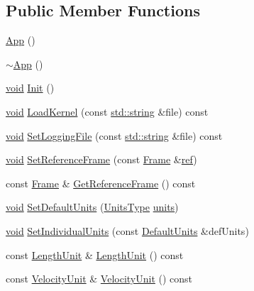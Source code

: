 \subsection*{Public Member Functions}
\begin{DoxyCompactItemize}
\item 
\hyperlink{class_app_acb8cbf3e285b91d0170ffe87df5989c5}{App} ()
\item 
\hyperlink{class_app_a34f1f253b1cef5f4ecbac66eaf6964ec}{$\sim$\+App} ()
\item 
\hyperlink{wglext_8h_a9e6b7f1933461ef318bb000d6bd13b83}{void} \hyperlink{class_app_a12b15f30e7c0a6f5a2ebf5b1b6dcb409}{Init} ()
\item 
\hyperlink{wglext_8h_a9e6b7f1933461ef318bb000d6bd13b83}{void} \hyperlink{class_app_a4c9cf8bd78997b07082a3a5d23e9f056}{Load\+Kernel} (const \hyperlink{glext_8h_ae84541b4f3d8e1ea24ec0f466a8c568b}{std\+::string} \&file) const 
\item 
\hyperlink{wglext_8h_a9e6b7f1933461ef318bb000d6bd13b83}{void} \hyperlink{class_app_a698fea2610b1e5767c12525b67b33e6d}{Set\+Logging\+File} (const \hyperlink{glext_8h_ae84541b4f3d8e1ea24ec0f466a8c568b}{std\+::string} \&file) const 
\item 
\hyperlink{wglext_8h_a9e6b7f1933461ef318bb000d6bd13b83}{void} \hyperlink{class_app_a8a64f7e38d933bdfde41d79ef0f847d0}{Set\+Reference\+Frame} (const \hyperlink{class_frame}{Frame} \&\hyperlink{glext_8h_ad32bdec748ba376f6c0d2df39ab9a95b}{ref})
\item 
const \hyperlink{class_frame}{Frame} \& \hyperlink{class_app_aae4a208c58219724eff18c9eb1e2ea64}{Get\+Reference\+Frame} () const 
\item 
\hyperlink{wglext_8h_a9e6b7f1933461ef318bb000d6bd13b83}{void} \hyperlink{class_app_a6503f750c4ed359bcd08db5a8e0c7008}{Set\+Default\+Units} (\hyperlink{class_app_aea5a9482f92f593735e0e6568c46b0d8}{Units\+Type} \hyperlink{glext_8h_abfa9efe7c13ea1f8f0756f7d74b32958}{units})
\item 
\hyperlink{wglext_8h_a9e6b7f1933461ef318bb000d6bd13b83}{void} \hyperlink{class_app_a2dd4b717c331d2afd0801ea589d35e0c}{Set\+Individual\+Units} (const \hyperlink{struct_app_1_1_default_units}{Default\+Units} \&def\+Units)
\item 
const \hyperlink{_quantity_8h_afb62d6d68e6cd2c62c96aa8c3aeb7d1f}{Length\+Unit} \& \hyperlink{class_app_ad04c66a48bfdbf61b6683b450708a8c7}{Length\+Unit} () const 
\item 
const \hyperlink{_quantity_8h_a4130b5cf107e9890a06c6c06bbfa7da3}{Velocity\+Unit} \& \hyperlink{class_app_af4c711d659e35f4dd32935045864084a}{Velocity\+Unit} () const 

\end{DoxyCompactItemize}
